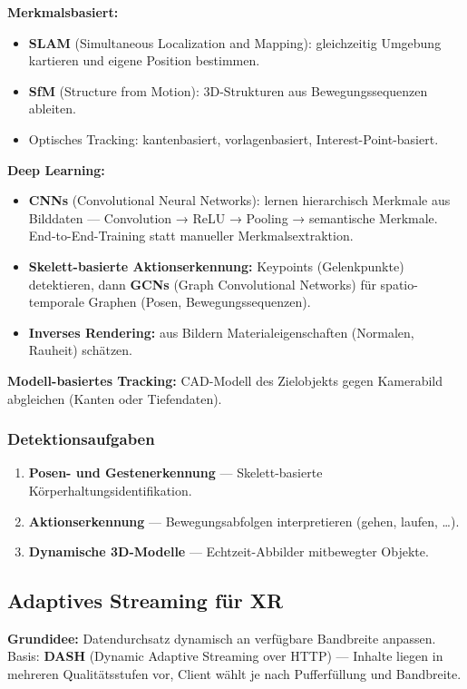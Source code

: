 \documentclass[12pt, a4paper]{article}
\begin{document}
\textbf{Merkmalsbasiert:}
\begin{itemize}
  \item \textbf{SLAM} (Simultaneous Localization and Mapping): gleichzeitig Umgebung kartieren und eigene Position bestimmen.
  \item \textbf{SfM} (Structure from Motion): 3D-Strukturen aus Bewegungssequenzen ableiten.
  \item Optisches Tracking: kantenbasiert, vorlagenbasiert, Interest-Point-basiert.
\end{itemize}

\textbf{Deep Learning:}
\begin{itemize}
  \item \textbf{CNNs} (Convolutional Neural Networks): lernen hierarchisch Merkmale aus Bilddaten — Convolution → ReLU → Pooling → semantische Merkmale. End-to-End-Training statt manueller Merkmalsextraktion.
  \item \textbf{Skelett-basierte Aktionserkennung:} Keypoints (Gelenkpunkte) detektieren, dann \textbf{GCNs} (Graph Convolutional Networks) für spatio-temporale Graphen (Posen, Bewegungssequenzen).
  \item \textbf{Inverses Rendering:} aus Bildern Materialeigenschaften (Normalen, Rauheit) schätzen.
\end{itemize}

\textbf{Modell-basiertes Tracking:} CAD-Modell des Zielobjekts gegen Kamerabild abgleichen (Kanten oder Tiefendaten).

\subsubsection*{Detektionsaufgaben}
\begin{enumerate}
  \item \textbf{Posen- und Gestenerkennung} — Skelett-basierte Körperhaltungsidentifikation.
  \item \textbf{Aktionserkennung} — Bewegungsabfolgen interpretieren (gehen, laufen, \dots).
  \item \textbf{Dynamische 3D-Modelle} — Echtzeit-Abbilder mitbewegter Objekte.
\end{enumerate}

\subsection{Adaptives Streaming für XR}

\textbf{Grundidee:} Datendurchsatz dynamisch an verfügbare Bandbreite anpassen. Basis: \textbf{DASH} (Dynamic Adaptive Streaming over HTTP) — Inhalte liegen in mehreren Qualitätsstufen vor, Client wählt je nach Pufferfüllung und Bandbreite.
\end{document}
